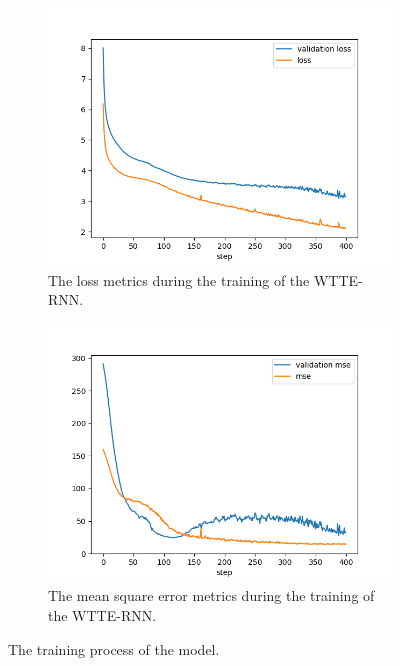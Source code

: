 \begin{figure}
\centering
\begin{subfigure}[b]{0.49\textwidth}
\centering
    \includegraphics[width=\linewidth]{figures/chapter4/wtte/loss.png}
    \caption{The loss metrics during the training of the WTTE-RNN.}
    \label{plot:wtte_loss}
\end{subfigure}
\begin{subfigure}[b]{0.49\textwidth}
    \centering
    \includegraphics[width=\linewidth]{figures/chapter4/wtte/mse.png}
    \caption{The mean square error metrics during the training of the WTTE-RNN.}
    \label{plot:wtte_mse}
\end{subfigure}
    \caption{The training process of the model.}
    \label{plot:wtte_training}
\end{figure}


